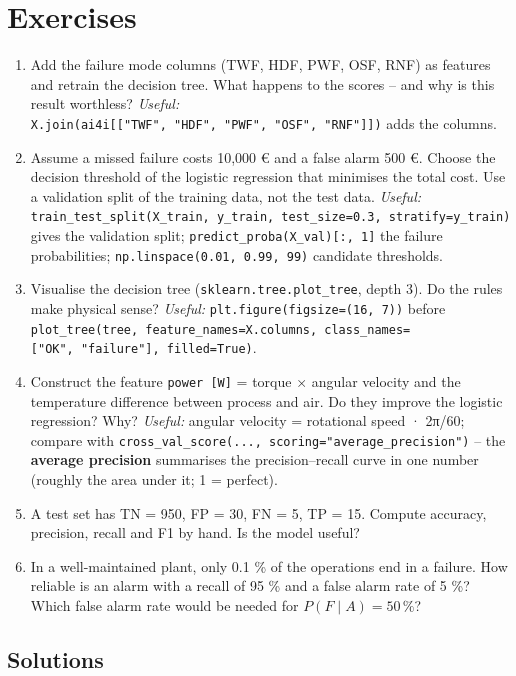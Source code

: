 \documentclass[
  letterpaper,
  DIV=11,
  numbers=noendperiod]{scrreprt}
\providecommand{\tightlist}{%
  \setlength{\itemsep}{0pt}\setlength{\parskip}{0pt}}\usepackage{longtable,booktabs,array}
\begin{document}
\section{Exercises}\label{exercises-7}

\begin{enumerate}
\def\labelenumi{\arabic{enumi}.}
\tightlist
\item
  Add the failure mode columns (TWF, HDF, PWF, OSF, RNF) as features and
  retrain the decision tree. What happens to the scores -- and why is
  this result worthless? \emph{Useful:}
  \texttt{X.join(ai4i{[}{[}"TWF",\ "HDF",\ "PWF",\ "OSF",\ "RNF"{]}{]})}
  adds the columns.
\item
  Assume a missed failure costs 10,000 € and a false alarm 500 €. Choose
  the decision threshold of the logistic regression that minimises the
  total cost. Use a validation split of the training data, not the test
  data. \emph{Useful:}
  \texttt{train\_test\_split(X\_train,\ y\_train,\ test\_size=0.3,\ stratify=y\_train)}
  gives the validation split; \texttt{predict\_proba(X\_val){[}:,\ 1{]}}
  the failure probabilities; \texttt{np.linspace(0.01,\ 0.99,\ 99)}
  candidate thresholds.
\item
  Visualise the decision tree (\texttt{sklearn.tree.plot\_tree}, depth
  3). Do the rules make physical sense? \emph{Useful:}
  \texttt{plt.figure(figsize=(16,\ 7))} before
  \texttt{plot\_tree(tree,\ feature\_names=X.columns,\ class\_names={[}"OK",\ "failure"{]},\ filled=True)}.
\item
  Construct the feature \texttt{power\ {[}W{]}} = torque × angular
  velocity and the temperature difference between process and air. Do
  they improve the logistic regression? Why? \emph{Useful:} angular
  velocity = rotational speed · 2π/60; compare with
  \texttt{cross\_val\_score(...,\ scoring="average\_precision")} -- the
  \textbf{average precision} summarises the precision--recall curve in
  one number (roughly the area under it; 1 = perfect).
\item
  A test set has TN = 950, FP = 30, FN = 5, TP = 15. Compute accuracy,
  precision, recall and F1 by hand. Is the model useful?
\item
  In a well-maintained plant, only 0.1 \% of the operations end in a
  failure. How reliable is an alarm with a recall of 95 \% and a false
  alarm rate of 5 \%? Which false alarm rate would be needed for
  \(P(F \mid A) = 50\,\%\)?
\end{enumerate}

\subsection{Solutions}\label{solutions-7}
\end{document}
